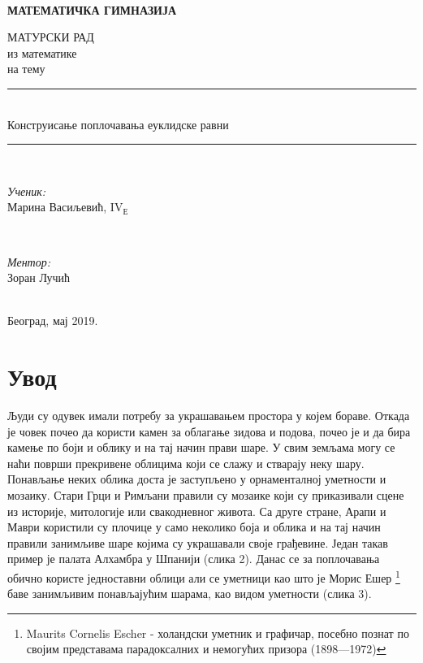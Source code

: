 \documentclass[12pt]{article}
\begin{document}
\newcommand{\HRule}{\rule{\linewidth}{0.5mm}} %

\thispagestyle{empty}
\\
\centerline{\LARGE \textbf{МАТЕМАТИЧКА ГИМНАЗИЈА}}

\vspace*{40mm}
\begin{center}
{\Large МАТУРСКИ РАД}\\
{\Large из математике}\\
{\Large	на тему}
\Huge\HRule\\[0.4cm] %
	{Конструисање поплочавања еуклидске равни}\\
	\HRule \\[20pt] %
\begin{minipage}{0.4\textwidth}
\begin{flushleft} \large
\emph{\Large Ученик:}\\
{\Large Марина Васиљевић}, IV$_\text{Е}$\\
\end{flushleft}
\end{minipage}
~
\begin{minipage}{0.4\textwidth}
\begin{flushright} \large
\vspace{0.5cm}
\emph{\Large Ментор:} \\
{\Large Зоран Лучић}\\ 
\end{flushright}
\end{minipage}\\[8cm]
\Large{Београд, мај 2019.}
\end{center}

\tableofcontents

\thispagestyle{empty}

\clearpage
\setcounter{page}{1}

\section{Увод}
Људи су одувек имали потребу за украшавањем простора у којем бораве.  Откада је човек почео да користи камен за облагање зидова и подова, почео је и да бира камење по боји и облику и на тај начин прави шаре.
У свим земљама могу се наћи површи прекривене облицима који се слажу и стварају неку шару. Понављање неких облика доста је заступљено у орнаменталној уметности и мозаику.
Стари Грци и Римљани правили су мозаике који су приказивали сцене из историје, митологије или свакодневног живота. Са друге стране, Арапи и Маври користили су плочице у само неколико боја и облика и на тај начин правили занимљиве шаре којима су украшавали своје грађевине. Један такав пример је палата Алхамбра у Шпанији (слика 2). Данас се за поплочавања обично користе једноставни облици али се уметници као што је Морис Ешер \footnote{Maurits Cornelis Escher - холандски уметник и графичар, посебно познат по својим представама парадоксалних и немогућих призора (1898—1972)} баве занимљивим понављајућим шарама, као видом уметности (слика 3).
\end{document}
